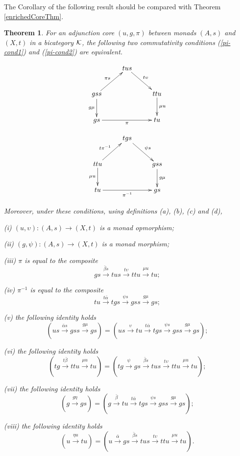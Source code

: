 \documentclass[a4paper,10pt]{article}
\newtheorem{theorem}{Theorem}
\newcommand{\bk}{{\cal{K}}}
\numberwithin{equation}{section}
\begin{document}
The Corollary of the following result should be compared with Theorem \ref{enrichedCoreThm}.

\begin{theorem} \label{Core-implies-lots}
For an adjunction core $(u,g,\pi)$ between monads $(A,s)$ and $(X,t)$ in a bicategory $\bk$, the following two commutativity conditions (\ref{pi-cond1}) and (\ref{pi-cond2}) are equivalent.

\begin{equation}\label{pi-cond1}
\xymatrix{
& tus \ar[rd]^-{ t \upsilon}  & \\
gss \ar[ru]^-{\pi s} \ar[d]_-{g \mu} & & ttu \ar[d]^-{\mu u} \\
g s \ar[rr]_-{\pi} & & tu }
\end{equation}

\begin{equation}\label{pi-cond2}
\xymatrix{
& tgs \ar[rd]^-{\psi s}  & \\
ttu \ar[ru]^-{t \pi^{-1}} \ar[d]_-{\mu u} & & gss \ar[d]^-{g \mu} \\
tu \ar[rr]_-{\pi^{-1}} & & gs } 
\end{equation}

Moreover, under these conditions, using definitions (a), (b), (c) and (d),

(i) $(u, \upsilon) : (A,s) \longrightarrow (X,t)$ is a monad opmorphism;

(ii) $(g, \psi) : (A,s) \longrightarrow (X,t)$ is a monad morphism;

(iii) $\pi$ is equal to the composite $$gs \overset{\bar{\beta} s} \longrightarrow tus \overset{t \upsilon} \longrightarrow ttu \overset{\mu u} \longrightarrow tu ;$$ 

(iv) $\pi^{-1}$ is equal to the composite $$tu \overset{t \bar{\alpha}} \longrightarrow tgs \overset{\psi s} \longrightarrow gss \overset{g \mu} \longrightarrow gs ;$$ 

(v) the following identity holds $$(us \overset{\bar{\alpha} s} \longrightarrow gss \overset{g \mu} \longrightarrow gs) = (us \overset{\upsilon} \longrightarrow tu \overset{t \bar{\alpha}} \longrightarrow tgs \overset{\psi s} \longrightarrow gss \overset{g \mu} \longrightarrow gs) ;$$

(vi) the following identity holds $$(tg \overset{t \bar{\beta}} \longrightarrow ttu \overset{\mu u} \longrightarrow tu) = (tg \overset{\psi} \longrightarrow gs \overset{\bar{\beta} s} \longrightarrow tus \overset{t \upsilon} \longrightarrow ttu \overset{\mu u} \longrightarrow tu) ;$$

(vii) the following identity holds $$(g \overset{g \eta} \longrightarrow gs) = (g \overset{\bar{\beta}} \longrightarrow tu \overset{t \bar{\alpha}} \longrightarrow tgs \overset{\psi s} \longrightarrow gss \overset{g \mu} \longrightarrow gs); $$

(viii) the following identity holds $$(u \overset{\eta u} \longrightarrow tu) = (u \overset{\bar{\alpha}} \longrightarrow gs \overset{\bar{\beta} s} \longrightarrow tus \overset{t \upsilon} \longrightarrow ttu \overset{\mu u} \longrightarrow tu). $$

\end{theorem}
\end{document}
